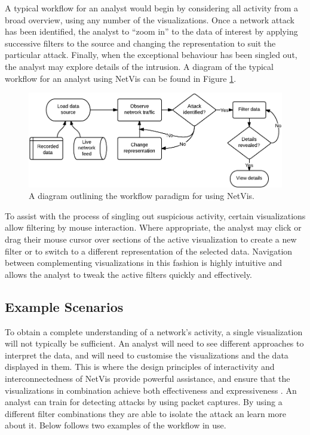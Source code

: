 A typical workflow for an analyst would begin by considering all activity from a broad overview,
using any number of the visualizations. Once a network attack has been identified, the analyst to
``zoom in'' to the data of interest by applying successive filters to the source and changing the
representation to suit the particular attack. Finally, when the exceptional behaviour has been
singled out, the analyst may explore details of the intrusion. A diagram of the typical workflow for
an analyst using NetVis can be found in Figure \ref{fig:workflow}.

\begin{figure}[htb]
   \centering
   \includegraphics[width=\linewidth]{materials/workflow-diagram.png}
   \caption[Workflow]{\label{fig:workflow}
         A diagram outlining the workflow paradigm for using NetVis.}
\end{figure}

To assist with the process of singling out suspicious activity, certain visualizations allow
filtering by mouse interaction. Where appropriate, the analyst may click or drag their mouse cursor
over sections of the active visualization to create a new filter or to switch to a different
representation of the selected data. Navigation between complementing visualizations in this fashion
is highly intuitive and allows the analyst to tweak the active filters quickly and effectively.

\subsection{Example Scenarios}
To obtain a complete understanding of a network's activity, a single visualization will not
typically be sufficient. An analyst will need to see different approaches to interpret the data, and
will need to customise the visualizations and the data displayed in them. This is where the design
principles of interactivity and interconnectedness of NetVis provide powerful assistance, and ensure
that the visualizations in combination achieve both effectiveness and expressiveness
\cite{mackinlay1987automatic}. An analyst can train for detecting attacks by using packet captures.
By using a different filter combinations they are able to isolate the attack an learn more about it.
Below follows two examples of the workflow in use.

